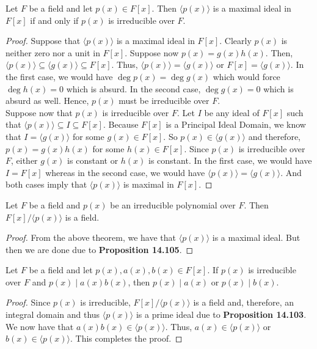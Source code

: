 \begin{proposition}
	Let $F$ be a field and let $p(x)\in F[x]$. Then $\langle p(x)\rangle$ is a maximal ideal in $F[x]$ if and only if $p(x)$ is irreducible over $F$.
\end{proposition}
\begin{proof}
	Suppose that $\langle p(x)\rangle$ is a maximal ideal in $F[x]$. Clearly $p(x)$ is neither zero nor a unit in $F[x]$. Suppose now $p(x)=g(x)h(x)$. Then, $\langle p(x)\rangle\subseteq\langle g(x)\rangle\subseteq F[x]$. Thus, $\langle p(x)\rangle=\langle g(x)\rangle$ or $F[x]=\langle g(x)\rangle$. In the first case, we would have $\deg p(x)=\deg g(x)$ which would force $\deg h(x)=0$ which is absurd. In the second case, $\deg g(x)=0$ which is absurd as well. Hence, $p(x)$ must be irreducible over $F$.\\
	Suppose now that $p(x)$ is irreducible over $F$. Let $I$ be any ideal of $F[x]$ such that $\langle p(x)\rangle\subseteq I\subseteq F[x]$. Because $F[x]$ is a Principal Ideal Domain, we know that $I=\langle g(x)\rangle$ for some $g(x)\in F[x]$. So $p(x)\in\langle g(x)\rangle$ and therefore, $p(x)=g(x)h(x)$ for some $h(x)\in F[x]$. Since $p(x)$ is irreducible over $F$, either $g(x)$ is constant or $h(x)$ is constant. In the first case, we would have $I=F[x]$ whereas in the second case, we would have $\langle p(x)\rangle =\langle g(x)\rangle$. And both cases imply that $\langle p(x)\rangle $ is maximal in $F[x]$.
\end{proof}

\begin{corollary}
	Let $F$ be a field and $p(x)$ be an irreducible polynomial over $F$. Then $F[x]/\langle p(x)\rangle$ is a field.
\end{corollary}
\begin{proof}
	From the above theorem, we have that $\langle p(x)\rangle$ is a maximal ideal. But then we are done due to \textbf{Proposition 14.105}.
\end{proof}

\begin{corollary}
	Let $F$ be a field and let $p(x),a(x),b(x)\in F[x]$. If $p(x)$ is irreducible over $F$ and $p(x)\mid a(x)b(x)$, then $p(x)\mid a(x)$ or $p(x)\mid b(x)$.
\end{corollary}
\begin{proof}
	Since $p(x)$ is irreducible, $F[x]/\langle p(x)\rangle$ is a field and, therefore, an integral domain and thus $\langle p(x)\rangle$ is a prime ideal due to \textbf{Proposition 14.103}. We now have that $a(x)b(x)\in\langle p(x)\rangle$. Thus, $a(x)\in\langle p(x)\rangle$ or $b(x)\in\langle p(x)\rangle$. This completes the proof.
\end{proof}

